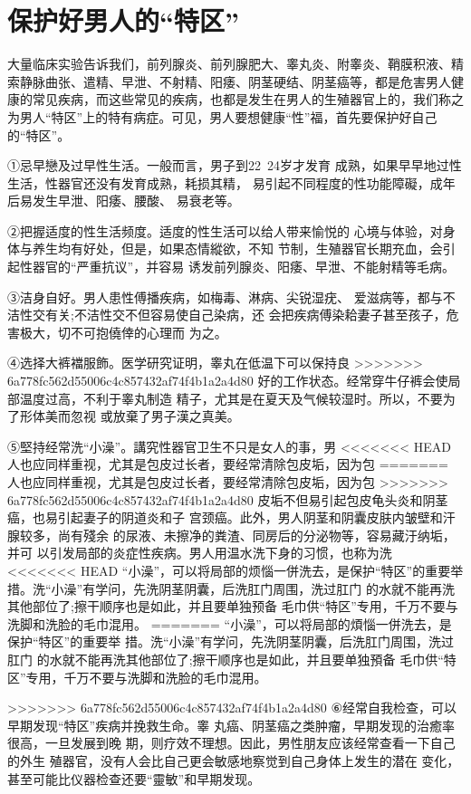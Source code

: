 \documentclass[12pt,UTF8]{ctexbook}
\begin{document}
\section{保护好男人的“特区”}

大量临床实验告诉我们，前列腺炎、前列腺肥大、睾丸炎、附睾炎、鞘膜积液、精索静脉曲张、遣精、早泄、不射精、阳痿、阴茎硬结、阴茎癌等，都是危害男人健康的常见疾病，而这些常见的疾病，也都是发生在男人的生殖器官上的，我们称之为男人“特区”上的特有病症。可见，男人要想健康“性”福，首先要保护好自己的“特区”。

①忌早戀及过早性生活。一般而言，男子到22~24岁才发育
成熟，如果早早地过性生活，性器官还没有发育成熟，耗损其精，
易引起不同程度的性功能障礙，成年后易发生早泄、阳痿、腰酸、
易衰老等。

②把握适度的性生活频度。适度的性生活可以给人带来愉悦的
心境与体验，对身体与养生均有好处，但是，如果态情縱欲，不知
节制，生殖器官长期充血，会引起性器官的“严重抗议”，并容易
诱发前列腺炎、阳痿、早泄、不能射精等毛病。

③洁身自好。男人患性傅播疾病，如梅毒、淋病、尖锐湿疣、
爱滋病等，都与不洁性交有关;不洁性交不但容易使自己染病，还
会把疾病傅染耠妻子甚至孩子，危害极大，切不可抱僥倖的心理而
为之。

④选择大裤襠服飾。医学研究证明，睾丸在低温下可以保持良
>>>>>>> 6a778fc562d55006c4c857432af74f4b1a2a4d80
好的工作状态。经常穿牛仔裤会使局部温度过高，不利于睾丸制造
精子，尤其是在夏天及气候较湿时。所以，不要为了形体美而忽视
或放棄了男子漢之真美。

⑤堅持经常洗“小澡”。講究性器官卫生不只是女人的事，男
<<<<<<< HEAD
人也应同样重视，尤其是包皮过长者，要经常清除包皮垢，因为包
=======
人也应同样重视，尤其是包皮过长者，要经常清除包皮垢，因为包
>>>>>>> 6a778fc562d55006c4c857432af74f4b1a2a4d80
皮垢不但易引起包皮龟头炎和阴茎癌，也易引起妻子的阴道炎和子
宫颈癌。此外，男人阴茎和阴囊皮肤内皱壁和汗腺较多，尚有殘余
的尿液、未擦净的粪渣、同房后的分泌物等，容易藏汙纳垢，并可
以引发局部的炎症性疾病。男人用温水洗下身的习惯，也称为洗
<<<<<<< HEAD
“小澡”，可以将局部的烦惱一併洗去，是保护“特区”的重要举
措。洗“小澡”有学问，先洗阴茎阴囊，后洗肛门周围，洗过肛门
的水就不能再洗其他部位了;擦干顺序也是如此，并且要单独预备
毛巾供“特区”专用，千万不要与洗脚和洗脸的毛巾混用。
=======
“小澡”，可以将局部的煩惱一併洗去，是保护“特区”的重要举
措。洗“小澡”有学问，先洗阴茎阴囊，后洗肛门周围，洗过肛门
的水就不能再洗其他部位了;擦干顺序也是如此，并且要单独預备
毛巾供“特区”专用，千万不要与洗脚和洗脸的毛巾混用。

>>>>>>> 6a778fc562d55006c4c857432af74f4b1a2a4d80
⑥经常自我检查，可以早期发现“特区”疾病并挽救生命。睾
丸癌、阴茎癌之类肿瘤，早期发现的治癒率很高，一旦发展到晚
期，则疗效不理想。因此，男性朋友应该经常查看一下自己的外生
殖器官，没有人会比自己更会敏感地察觉到自己身体上发生的潜在
变化，甚至可能比仪器检查还要“靈敏”和早期发现。
\end{document}
